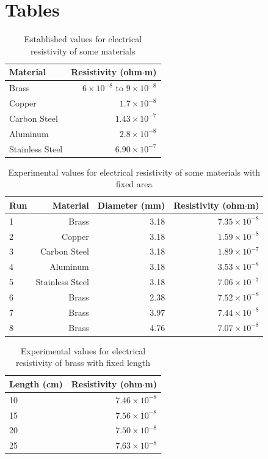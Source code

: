 \section{Tables}
%
\begin{table}[ht]
	\centering
	\begin{tabular}{|l|r|}
		\hline
		Material & Resistivity (ohm$\cdot$m) \\
		\hline
		Brass & $6 \times 10^{-8}$ to $9 \times 10^{-8}$ \\
		Copper & $1.7 \times 10^{-8}$ \\
		Carbon Steel & $1.43 \times 10^{-7}$ \\
		Aluminum & $2.8 \times 10^{-8}$ \\
		Stainless Steel & $6.90 \times 10^{-7}$ \\
		\hline
	\end{tabular}
	\caption{Established values for electrical resistivity of some materials}
	\label{table.02.established}
\end{table}
%
\begin{table}[ht]
	\centering
	\begin{tabular}{|l|r|r|r|}
		\hline
		Run & Material & Diameter (mm) & Resistivity (ohm$\cdot$m) \\
		\hline
		1 & Brass & 3.18 & $7.35 \times 10^{-8}$ \\
		2 & Copper & 3.18 & $1.59 \times 10^{-8}$ \\
		3 & Carbon Steel & 3.18 & $1.89 \times 10^{-7}$ \\
		4 & Aluminum & 3.18 & $3.53 \times 10^{-8}$ \\
		5 & Stainless Steel & 3.18 & $7.06 \times 10^{-7}$ \\
		6 & Brass & 2.38 & $7.52 \times 10^{-8}$ \\
		7 & Brass & 3.97 & $7.44 \times 10^{-8}$ \\
		8 & Brass & 4.76 & $7.07 \times 10^{-8}$ \\
		\hline
	\end{tabular}
	\caption{Experimental values for electrical resistivity of some materials with fixed area}
	\label{table.02.experimental.area}
\end{table}
%
\begin{table}[ht]
	\centering
	\begin{tabular}{|l|r|}
		\hline
		Length (cm) & Resistivity (ohm$\cdot$m) \\
		\hline
		10 & $7.46 \times 10^{-8}$ \\
		15 & $7.56 \times 10^{-8}$ \\
		20 & $7.50 \times 10^{-8}$ \\
		25 & $7.63 \times 10^{-8}$ \\
		\hline
	\end{tabular}
	\caption{Experimental values for electrical resistivity of brass with fixed length}
	\label{table.02.experimental.length}
\end{table}
%
\FloatBarrier
\newpage
